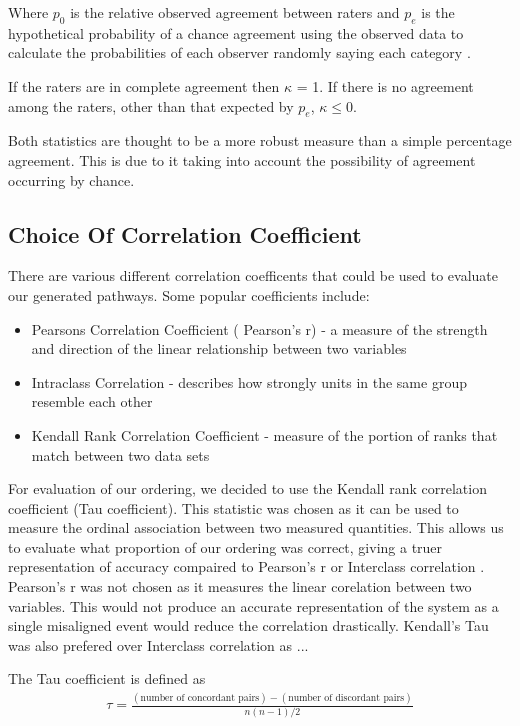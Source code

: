 \documentclass[bsc,frontabs,twoside,singlespacing,parskip,deptreport]{infthesis}     %
\begin{document}
Where $p_0$ is the relative observed agreement between raters and $p_e$ is the hypothetical probability
of a chance agreement using the observed data to calculate the probabilities of each observer randomly saying each category \cite{}.

If the raters are in complete agreement then $\kappa$ = 1.
If there is no agreement among the raters, other than that expected by $p_e$, $\kappa \leq 0$.

Both statistics are thought to be a more robust measure than a simple percentage agreement.
This is due to it taking into account the possibility of agreement occurring by chance.

\subsection{Choice Of Correlation Coefficient}\label{sec:kendall}

There are various different correlation coefficents that could be used to evaluate our generated pathways.
Some popular coefficients include:
\begin{itemize}
\item Pearsons Correlation Coefficient ( Pearson's r) - a measure of the strength and direction of the linear relationship between two variables
\item Intraclass Correlation - describes how strongly units in the same group resemble each other
\item Kendall Rank Correlation Coefficient -  measure of the portion of ranks that match between two data sets
\end{itemize}

For evaluation of our ordering, we decided to use the Kendall rank correlation coefficient (Tau coefficient).
This statistic was chosen as it can be used to measure the ordinal association between two measured quantities.
This allows us to evaluate what proportion of our ordering was correct, giving a truer representation of accuracy
compaired to Pearson's r or Interclass correlation \cite{}.
Pearson's r was not chosen as it measures the linear corelation between two variables\cite{}.
This would not produce an accurate representation of the system as a single misaligned event would reduce the
correlation drastically.
Kendall's Tau was also prefered over Interclass correlation as ...\cite{}


The Tau coefficient is defined as
\begin{eqnarray}
  \tau=\frac{(\text{number of concordant pairs})-(\text{number of discordant pairs})}{n(n-1)/2}\nonumber
\end{eqnarray}\cite{abdi2007kendall}
\end{document}
